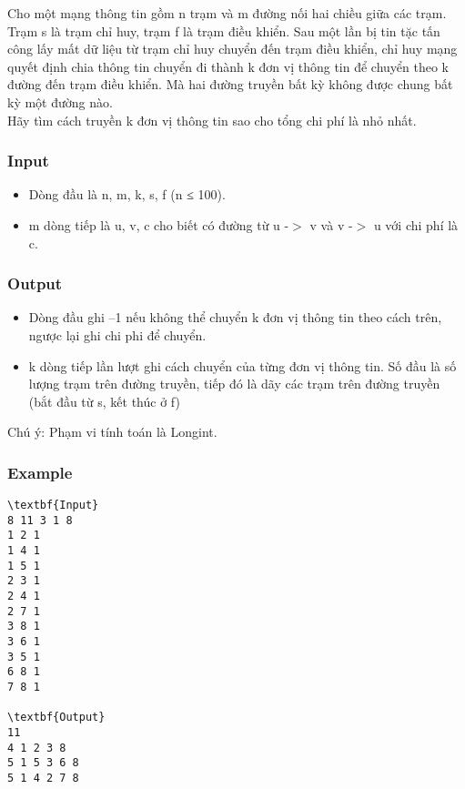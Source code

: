 

Cho một mạng thông tin gồm n trạm và m đường nối hai chiều giữa các trạm. Trạm s là trạm chỉ huy, trạm f là trạm điều khiển. Sau một lần bị tin tặc tấn công lấy mất dữ liệu từ trạm chỉ huy chuyển đến trạm điều khiển, chỉ huy mạng quyết định chia thông tin chuyển đi thành k đơn vị thông tin để chuyển theo k đường đến trạm điều khiển. Mà hai đường truyền bất kỳ không được chung bất kỳ một đường nào.
\\Hãy tìm cách truyền k đơn vị thông tin sao cho tổng chi phí là nhỏ nhất.

\subsubsection{Input}
\begin{itemize}
	\item Dòng đầu là n, m, k, s, f (n ≤ 100).
	\item m dòng tiếp là u, v, c cho biết có đường từ u -$>$ v và v -$>$ u với chi phí là c.
\end{itemize}

\subsubsection{Output}
\begin{itemize}
	\item Dòng đầu ghi –1 nếu không thể chuyển k đơn vị thông tin theo cách trên, ngược lại ghi chi phi để chuyển.
	\item k dòng tiếp lần lượt ghi cách chuyển của từng đơn vị thông tin. Số đầu là số lượng trạm trên đường truyền, tiếp đó là dãy các trạm trên đường truyền (bắt đầu từ s, kết thúc ở f)
\end{itemize}

Chú ý: Phạm vi tính toán là Longint.

\subsubsection{Example}
\begin{verbatim}
\textbf{Input}
8 11 3 1 8
1 2 1
1 4 1
1 5 1
2 3 1
2 4 1
2 7 1
3 8 1
3 6 1
3 5 1
6 8 1
7 8 1

\textbf{Output}
11
4 1 2 3 8
5 1 5 3 6 8
5 1 4 2 7 8

\end{verbatim}
